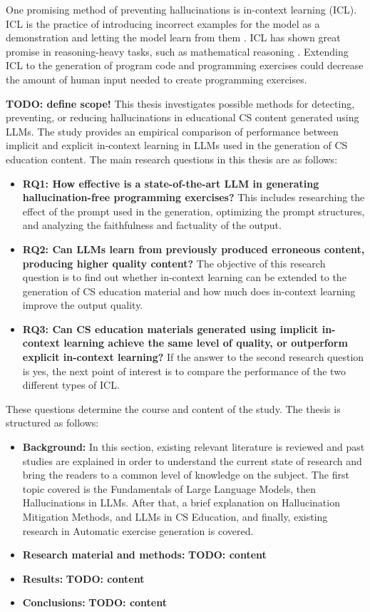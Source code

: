 \documentclass[english, 12pt, a4paper, sci, utf8, a-2b, online]{../definitions/aaltothesis}
\begin{document}
One promising method of preventing hallucinations is in-context learning (ICL). ICL is the practice of introducing incorrect examples for the model as a demonstration and letting the model learn from them \cite{dong-etal-2024-survey}. ICL has shown great promise in reasoning-heavy tasks, such as mathematical reasoning \cite{an2024learningmistakesmakesllm}. Extending ICL to the generation of program code and programming exercises could decrease the amount of human input needed to create programming exercises.

\textbf{TODO: define scope!} This thesis investigates possible methods for detecting, preventing, or reducing hallucinations in educational CS content generated using LLMs. The study provides an empirical comparison of performance between implicit and explicit in-context learning in LLMs used in the generation of CS education content. The main research questions in this thesis are as follows:

\begin{itemize}
    \item \textbf{RQ1: How effective is a state-of-the-art LLM in generating hallucination-free programming exercises?} This includes researching the effect of the prompt used in the generation, optimizing the prompt structures, and analyzing the faithfulness and factuality of the output.
    \item \textbf{RQ2: Can LLMs learn from previously produced erroneous content, producing higher quality content?} The objective of this research question is to find out whether in-context learning can be extended to the generation of CS education material and how much does in-context learning improve the output quality.
    \item \textbf{RQ3: Can CS education materials generated using implicit in-context learning achieve the same level of quality, or outperform explicit in-context learning?} If the answer to the second research question is yes, the next point of interest is to compare the performance of the two different types of ICL.
\end{itemize}

These questions determine the course and content of the study. The thesis is structured as follows:

\begin{itemize}
    \item \textbf{Background:} In this section, existing relevant literature is reviewed and past studies are explained in order to understand the current state of research and bring the readers to a common level of knowledge on the subject. The first topic covered is the Fundamentals of Large Language Models, then Hallucinations in LLMs. After that, a brief explanation on Hallucination Mitigation Methods, and LLMs in CS Education, and finally, existing research in Automatic exercise generation is covered.
    \item \textbf{Research material and methods:} \textbf{TODO: content}
    \item \textbf{Results:} \textbf{TODO: content}
    \item \textbf{Conclusions:} \textbf{TODO: content}
\end{itemize}
\end{document}
